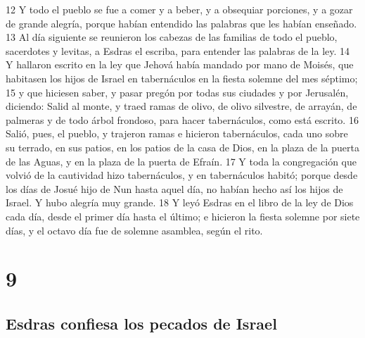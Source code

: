 12 Y todo el pueblo se fue a comer y a beber, y a obsequiar porciones, y a gozar de grande alegría, porque habían entendido las palabras que les habían enseñado.
13 Al día siguiente se reunieron los cabezas de las familias de todo el pueblo, sacerdotes y levitas, a Esdras el escriba, para entender las palabras de la ley.
14 Y hallaron escrito en la ley que Jehová había mandado por mano de Moisés, que habitasen los hijos de Israel en tabernáculos en la fiesta solemne del mes séptimo;
15 y que hiciesen saber, y pasar pregón por todas sus ciudades y por Jerusalén, diciendo: Salid al monte, y traed ramas de olivo, de olivo silvestre, de arrayán, de palmeras y de todo árbol frondoso, para hacer tabernáculos, como está escrito. 
16 Salió, pues, el pueblo, y trajeron ramas e hicieron tabernáculos, cada uno sobre su terrado, en sus patios, en los patios de la casa de Dios, en la plaza de la puerta de las Aguas, y en la plaza de la puerta de Efraín.
17 Y toda la congregación que volvió de la cautividad hizo tabernáculos, y en tabernáculos habitó; porque desde los días de Josué hijo de Nun hasta aquel día, no habían hecho así los hijos de Israel. Y hubo alegría muy grande.
18 Y leyó Esdras en el libro de la ley de Dios cada día, desde el primer día hasta el último; e hicieron la fiesta solemne por siete días, y el octavo día fue de solemne asamblea, según el rito.

\chapter{9}

\section*{Esdras confiesa los pecados de Israel}

